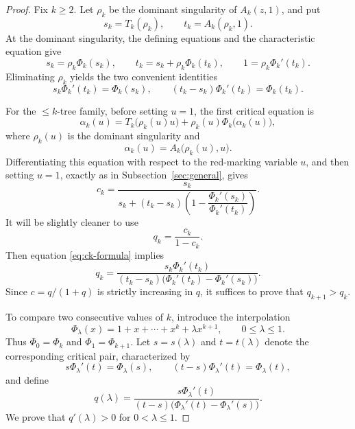 \documentclass[10pt,a4paper]{amsart}
\theoremstyle{remark}
\begin{document}
\begin{proof}
Fix $k\ge2$.  Let $\rho_k$ be the dominant singularity of $A_k(z,1)$, and put
\[
s_k=T_k(\rho_k),
\qquad
t_k=A_k(\rho_k,1).
\]
At the dominant singularity, the defining equations and the characteristic equation give
\begin{equation}
\label{eq:bounded-critical}
s_k=\rho_k\Phi_k(s_k),
\qquad
t_k=s_k+\rho_k\Phi_k(t_k),
\qquad
1=\rho_k\Phi_k'(t_k).
\end{equation}
Eliminating $\rho_k$ yields the two convenient identities
\begin{equation}
\label{eq:bounded-critical2}
s_k\Phi_k'(t_k)=\Phi_k(s_k),
\qquad
(t_k-s_k)\Phi_k'(t_k)=\Phi_k(t_k).
\end{equation}

For the $\leq k$-tree family, before setting $u=1$, the first critical equation is
\[
\alpha_k(u)
=
T_k\bigl(\rho_k(u)u\bigr)
+
\rho_k(u)\Phi_k\bigl(\alpha_k(u)\bigr),
\]
where $\rho_k(u)$ is the dominant singularity and
\[
\alpha_k(u)=A_k\bigl(\rho_k(u),u\bigr).
\]
Differentiating this equation with respect to the red-marking variable $u$, and then setting $u=1$, exactly as in Subsection~\ref{sec:general}, gives
\begin{equation}
\label{eq:ck-formula}
c_k=
\frac{s_k}
{s_k+(t_k-s_k)\left(1-\dfrac{\Phi_k'(s_k)}{\Phi_k'(t_k)}\right)}.
\end{equation}
It will be slightly cleaner to use
\[
q_k=\frac{c_k}{1-c_k}.
\]
Then equation \eqref{eq:ck-formula} implies
\begin{equation}
\label{eq:qk-formula}
q_k=
\frac{s_k\Phi_k'(t_k)}
{(t_k-s_k)\bigl(\Phi_k'(t_k)-\Phi_k'(s_k)\bigr)}.
\end{equation}
Since $c=q/(1+q)$ is strictly increasing in $q$, it suffices to prove that $q_{k+1}>q_k$.

To compare two consecutive values of $k$, introduce the interpolation
\[
\Phi_\lambda(x)=1+x+\cdots+x^k+\lambda x^{k+1},
\qquad 0\le\lambda\le1.
\]
Thus $\Phi_0=\Phi_k$ and $\Phi_1=\Phi_{k+1}$.  Let $s=s(\lambda)$ and $t=t(\lambda)$ denote the corresponding critical pair, characterized by
\begin{equation}
\label{eq:lambda-critical}
s\Phi_\lambda'(t)=\Phi_\lambda(s),
\qquad
(t-s)\Phi_\lambda'(t)=\Phi_\lambda(t),
\end{equation}
and define
\[
q(\lambda)=
\frac{s\Phi_\lambda'(t)}
{(t-s)\bigl(\Phi_\lambda'(t)-\Phi_\lambda'(s)\bigr)}.
\]
We prove that $q'(\lambda)>0$ for $0<\lambda\le1$.


\end{proof}
\end{document}

